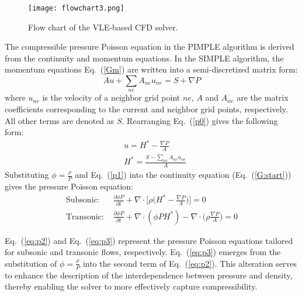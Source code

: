\begin{figure}[htbp]
	\centering
	\texttt{[image: flowchart3.png]}
	\centering
	\caption{Flow chart of the VLE-based CFD solver.}
	\label{FC_CFD}
\end{figure}

The compressible pressure Poisson equation in the PIMPLE algorithm is derived from the continuity and momentum equations. In the SIMPLE algorithm, the momentum equations Eq.~(\ref{Gm}) are written into a semi-discretized matrix form:
\begin{equation}
	A u+ \sum_{ne} A_{ne} u_{ne} =S+\nabla P \label{p0}
\end{equation}
where $u_{ne}$ is the velocity of a neighbor grid point $ne$, $A$ and $A_{ne}$ are the matrix coefficients corresponding to the current and neighbor grid points, respectively. All other terms are denoted as $S$. Rearranging Eq.~(\ref{p0}) gives the following form:
\begin{align}
	 & u=H^*-\frac{\nabla P}{A}\label{p1}       \\
	 & H^* =\frac{S-\sum_{ne} A_{ne} u_{ne}}{A}
\end{align}
Substituting $\phi=\frac{\rho} {P}$ and Eq.~(\ref{p1}) into the continuity equation (Eq.~(\ref{G:start})) gives the pressure Poisson equation:
\begin{align}
	\text{Subsonic: }  & \frac{\partial\phi P}{\partial t}+\nabla\cdot \Bigg[\rho \bigg(H^*- \frac{\nabla P}{A}\bigg)\Bigg]=0 \label{eq:p2}         \\
	\text{Transonic: } & \frac{\partial\phi P}{\partial t}+\nabla\cdot (\phi P H^*)-\nabla\cdot \bigg(\rho \frac{\nabla P}{A}\bigg)=0 \label{eq:p3}
\end{align}

Eq.~(\ref{eq:p2}) and Eq.~(\ref{eq:p3}) represent the pressure Poisson equations tailored for subsonic and transonic flows, respectively. Eq.~(\ref{eq:p3}) emerges from the substitution of $\phi=\frac{\rho} {P}$ into the second term of Eq.~(\ref{eq:p2}). This alteration serves to enhance the description of the interdependence between pressure and density, thereby enabling the solver to more effectively capture compressibility.


